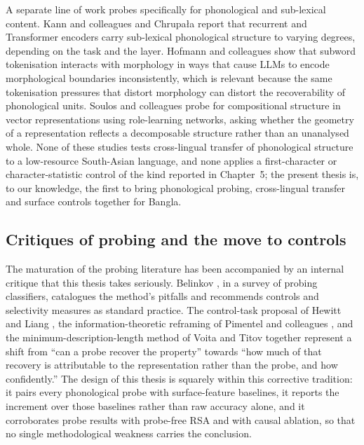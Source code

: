 A separate line of work probes specifically for phonological and sub-lexical content. Kann and colleagues \cite{kann2018phonological} and Chrupa\l{}a \cite{chrupala2019phonological} report that recurrent and Transformer encoders carry sub-lexical phonological structure to varying degrees, depending on the task and the layer. Hofmann and colleagues \cite{hofmann2021superbizarre} show that subword tokenisation interacts with morphology in ways that cause LLMs to encode morphological boundaries inconsistently, which is relevant because the same tokenisation pressures that distort morphology can distort the recoverability of phonological units. Soulos and colleagues \cite{soulos2021structural} probe for compositional structure in vector representations using role-learning networks, asking whether the geometry of a representation reflects a decomposable structure rather than an unanalysed whole. None of these studies tests cross-lingual transfer of phonological structure to a low-resource South-Asian language, and none applies a first-character or character-statistic control of the kind reported in Chapter~5; the present thesis is, to our knowledge, the first to bring phonological probing, cross-lingual transfer and surface controls together for Bangla.

\subsection{Critiques of probing and the move to controls}

The maturation of the probing literature has been accompanied by an internal critique that this thesis takes seriously. Belinkov \cite{belinkov2022probing}, in a survey of probing classifiers, catalogues the method's pitfalls and recommends controls and selectivity measures as standard practice. The control-task proposal of Hewitt and Liang \cite{hewitt2019control}, the information-theoretic reframing of Pimentel and colleagues \cite{pimentel2020information}, and the minimum-description-length method of Voita and Titov \cite{voita2020mdl} together represent a shift from ``can a probe recover the property'' towards ``how much of that recovery is attributable to the representation rather than the probe, and how confidently.'' The design of this thesis is squarely within this corrective tradition: it pairs every phonological probe with surface-feature baselines, it reports the increment over those baselines rather than raw accuracy alone, and it corroborates probe results with probe-free RSA and with causal ablation, so that no single methodological weakness carries the conclusion.

